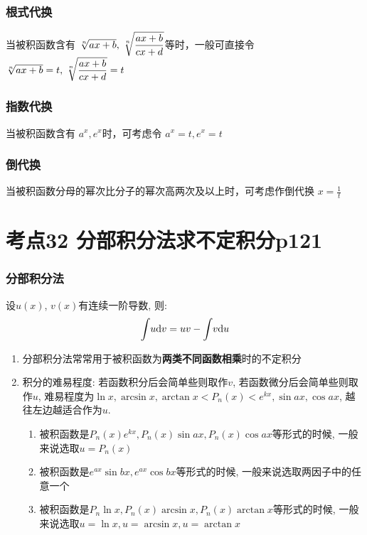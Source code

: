 \subsubsection{根式代换}

当被积函数含有 $\sqrt[n]{ax+b},\displaystyle\hspace{.2em}\sqrt[n]{\frac{ax+b}{cx+d}}$等时，一般可直接令 $\sqrt[n]{ax+b}=t,\displaystyle\hspace{.2em}\sqrt[n]{\frac{ax+b}{cx+d}}=t$

\subsubsection{指数代换}

当被积函数含有 $a^x,e^x$时，可考虑令 $a^x=t,e^x=t$

\subsubsection{倒代换}

当被积函数分母的幂次比分子的幂次高两次及以上时，可考虑作倒代换 $x=\frac{1}{t}$

\section{考点32 分部积分法求不定积分p121}

\subsubsection{分部积分法}
设$ u(x) $, $ v(x) $有连续一阶导数, 则:
\begin{equation*}
\displaystyle\int_{}\hspace{.2em}u \mathrm{d}v=uv-\displaystyle\int_{}\hspace{.2em}v \mathrm{d}u
\end{equation*}
\begin{tcolorbox}
\begin{enumerate}
\item 分部积分法常常用于被积函数为\textbf{两类不同函数相乘}时的不定积分
\item 积分的难易程度: 若函数积分后会简单些则取作$ v $, 若函数微分后会简单些则取作$ u $, 难易程度为$ \ln x, \arcsin x, \arctan x<P_{n}(x)<e^{kx}, \sin ax, \cos ax $, 越往左边越适合作为$ u $.
\begin{enumerate}
\item 被积函数是$ P_{n}(x)e^{kx}, P_{n}(x)\sin ax, P_{n}(x)\cos ax $等形式的时候, 一般来说选取$ u=P_{n}(x) $
\item 被积函数是$ e^{ax}\sin bx, e^{ax}\cos bx $等形式的时候, 一般来说选取两因子中的任意一个
\item 被积函数是$ P_{n}\ln x, P_{n}(x)\arcsin x, P_{n}(x)\arctan x $等形式的时候, 一般来说选取$ u=\ln x, u=\arcsin x, u=\arctan x $
\end{enumerate}
\end{enumerate}
\end{tcolorbox}

